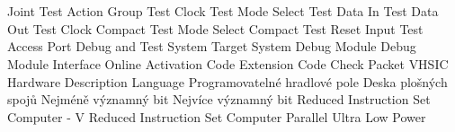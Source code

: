 \cleardoublepage
\chapter*{\listofabbrevname}
{}

\begin{acronym}[KolikMista]

		{Joint Test Action Group}
		{Test Clock}
		{Test Mode Select}
		{Test Data In}
		{Test Data Out}
		{Test Clock Compact}
		{Test Mode Select Compact}
		{Test Reset Input}
		{Test Access Port}
		{Debug and Test System}
		{Target System}
		{Debug Module}
		{Debug Module Interface}
		{Online Activation Code}	
		{Extension Code}
		{Check Packet}
		{VHSIC Hardware Description Language}
		{Programovatelné hradlové pole}
		{Deska plošných spojů}
		{Nejméně významný bit}
		{Nejvíce významný bit}
		{Reduced Instruction Set Computer - V}
		{Reduced Instruction Set Computer}
		{Parallel Ultra Low Power}	
\end{acronym}
